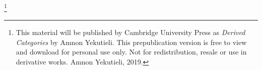 \documentclass[10pt, a4paper]{amsart}
\theoremstyle{definition}
\numberwithin{equation}{subsection}
\newcommand{\AYcopyright}{
\footnote[0]{This material will be published by Cambridge University Press
as {\em Derived Categories} by Amnon Yekutieli. This prepublication version
is free to view and download for personal use only. Not for redistribution,
resale or use in derivative works. \textcopyright Amnon Yekutieli, 2019.}}
\begin{document}
\begin{abstract}
Feedback from readers (corrections and suggestions) is most welcome. 
\end{abstract}

\AYcopyright

\maketitle

\thispagestyle{fancy} 


\cleardoublepage
\tableofcontents






  





 





\printindex
\end{document}
